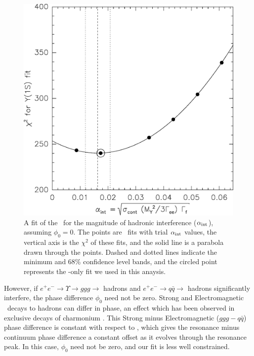 \documentclass{cornell}
\begin{document}
\begin{figure}[p]
  \begin{center}
    \includegraphics[width=0.8\linewidth]{simpleintfit}
  \end{center}
  \caption[Best-fit interference between resonance and continuum
  \qqbar]{\label{simpleintfit} A fit of the \us\ for the magnitude of
  hadronic interference ($\alpha_{\mbox{\scriptsize int}}$), assuming $\phi_0 = 0$.
  The points are \us\ fits with trial $\alpha_{\mbox{\scriptsize int}}$ values, the
  vertical axis is the $\chi^2$ of these fits, and the solid line is a
  parabola drawn through the points.  Dashed and dotted lines indicate
  the minimum and 68\% confidence level bands, and the circled point
  represents the \qqbar-only fit we used in this anaysis.}
\end{figure}

However, if $e^+e^- \to \Upsilon \to ggg \to$ hadrons and $e^+e^- \to
q\bar{q} \to$ hadrons significantly interfere, the phase difference
$\phi_0$ need not be zero.  Strong and Electromagnetic \ups\ decays to
hadrons can differ in phase, an effect which has been observed in
exclusive decays of charmonium \cite{charmphase}
\cite{charmcharmphase}.  This Strong minus Electromagnetic ($ggg -
q\bar{q}$) phase difference is constant with respect to \ecm, which
gives the resonance minus continuum phase difference a constant offset
as it evolves through the resonance peak.  In this case, $\phi_0$ need
not be zero, and our fit is less well constrained.
\end{document}

